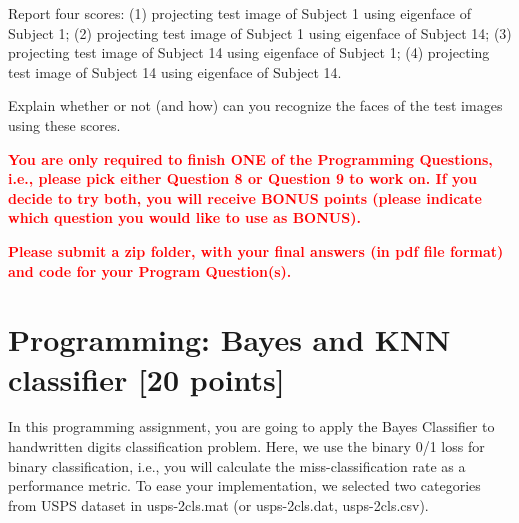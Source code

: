 \documentclass[a4paper,12pt,fleqn]{article}
\begin{document}
\begin{enumerate}
Report four scores: (1) projecting test image of Subject 1 using eigenface of Subject 1; (2) projecting test image of Subject 1 using eigenface of Subject 14; (3) projecting test image of Subject 14 using eigenface of Subject 1; (4) projecting test image of Subject 14 using eigenface of Subject 14. 

Explain whether or not (and how) can you recognize the faces of the test images using these scores. 


\end{enumerate}


\clearpage
\textcolor{red}{\bf
You are only required to finish ONE of the Programming Questions, i.e., please pick either Question 8 or Question 9 to work on. If you decide to try both, you will receive BONUS points (please indicate which question you would like to use as BONUS).
}

\textcolor{red}{\bf Please submit a zip folder, with your final answers (in pdf file format) and code for your Program Question(s).}

\section{Programming: Bayes and KNN classifier [20 points]}


In this programming assignment, you are going to apply the Bayes Classifier to handwritten digits classification problem. Here, we use the binary 0/1 loss for binary classification, i.e., you will calculate the miss-classification rate as a performance metric. To ease your implementation, we selected two categories from USPS dataset in \textsf{usps-2cls.mat} (or \textsf{usps-2cls.dat}, \textsf{usps-2cls.csv}).
\end{document}

